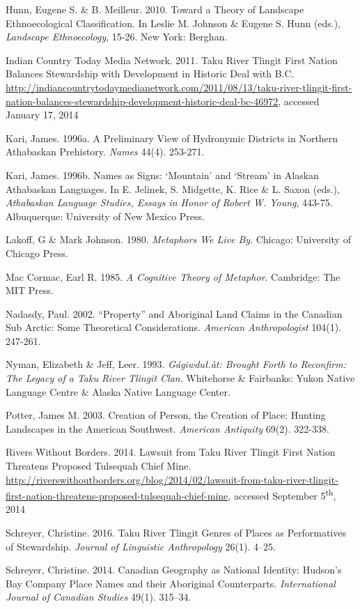 \begin{hang}
Hunn, Eugene S. \& B. Meilleur. 2010. Toward a Theory of Landscape Ethnoecological Classification. In Leslie M. Johnson \& Eugene S. Hunn (eds.), \textit{Landscape Ethnoecology},  15-26. New York: Berghan.

Indian Country Today Media Network. 2011. Taku River Tlingit First Nation Balances Stewardship with Development in Historic Deal with B.C. \url{http://indiancountrytodaymedianetwork.com/2011/08/13/taku-river-tlingit-first-nation-balances-stewardship-development-historic-deal-bc-46972}, accessed January 17, 2014

Kari, James. 1996a. A Preliminary View of Hydronymic Districts in Northern Athabaskan Prehistory. \textit{Names} 44(4). 253-271.

Kari, James. 1996b.  Names as Signs: ‘Mountain’ and ‘Stream’ in Alaskan Athabaskan Languages. In E.  Jelinek, S. Midgette, K. Rice \& L. Saxon (eds.), \textit{Athabaskan Language Studies, Essays in Honor of Robert W. Young}, 443-75. Albuquerque:  University of New Mexico Press.

Lakoff, G \& Mark Johnson. 1980. \textit{Metaphors We Live By}. Chicago: University of Chicago Press.

Mac Cormac, Earl R. 1985. \textit{A Cognitive Theory of Metaphor}. Cambridge: The MIT Press.

Nadasdy, Paul. 2002. “Property” and Aboriginal Land Claims in the Canadian Sub Arctic: Some  Theoretical Considerations. \textit{American Anthropologist} 104(1). 247-261.

Nyman, Elizabeth \& Jeff, Leer. 1993. \textit{Gágiwduł.àt: Brought Forth to Reconfirm: The Legacy of a Taku River Tlingit Clan}.
 Whitehorse \& Fairbanks: Yukon Native Language Centre \& Alaska Native Language Center.

Potter, James M. 2003. Creation of Person, the Creation of Place: Hunting Landscapes in the American Southwest. \textit{American Antiquity} 69(2). 322-338.

Rivers Without Borders. 2014. Lawsuit from Taku River Tlingit First Nation Threatens Proposed Tulsequah Chief  Mine. \url{http://riverswithoutborders.org/blog/2014/02/lawsuit-from-taku-river-tlingit-first-nation-threatens-proposed-tulsequah-chief-mine}, accessed September 5\textsuperscript{th}, 2014

Schreyer, Christine. 2016. Taku River Tlingit Genres of Places as Performatives of Stewardship. \textit{Journal of Linguistic Anthropology} 26(1). 4--25.

Schreyer, Christine. 2014. Canadian Geography as National Identity: Hudson’s Bay Company Place Names and  their Aboriginal Counterparts. \textit{International Journal of Canadian Studies} 49(1). 315--34.


\end{hang}
